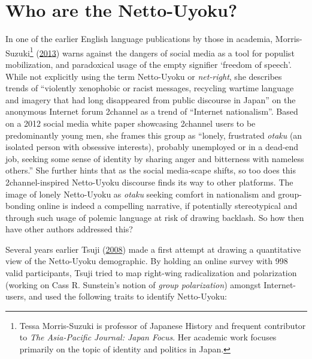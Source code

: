 \documentclass[10pt,british,A4paper,,openany]{memoir}
\begin{document}
\section{Who are the Netto-Uyoku?}\label{who-are-the-netto-uyoku}

In one of the earlier English language publications by those in
academia, Morris-Suzuki\footnote{Tessa Morris-Suzuki is professor of
  Japanese History and frequent contributor to \emph{The Asia-Pacific
  Journal: Japan Focus}. Her academic work focuses primarily on the
  topic of identity and politics in Japan.}
(\protect\hyperlink{ref-morris-suzuki_freedom_2013}{2013}) warns against
the dangers of social media as a tool for populist mobilization, and
paradoxical usage of the empty signifier `freedom of speech'. While not
explicitly using the term Netto-Uyoku or \emph{net-right}, she describes
trends of ``violently xenophobic or racist messages, recycling wartime
language and imagery that had long disappeared from public discourse in
Japan'' on the anonymous Internet forum 2channel as a trend of
``Internet nationalism''. Based on a 2012 social media white paper
showcasing 2channel users to be predominantly young men, she frames this
group as ``lonely, frustrated \emph{otaku} (an isolated person with
obsessive interests), probably unemployed or in a dead-end job, seeking
some sense of identity by sharing anger and bitterness with nameless
others.'' She further hints that as the social media-scape shifts, so
too does this 2channel-inspired Netto-Uyoku discourse finds its way to
other platforms. The image of lonely Netto-Uyoku as \emph{otaku} seeking
comfort in nationalism and group-bonding online is indeed a compelling
narrative, if potentially stereotypical and through such usage of
polemic language at risk of drawing backlash. So how then have other
authors addressed this?

Several years earlier Tsuji
(\protect\hyperlink{ref-tsuji_eng:_2008}{2008}) made a first attempt at
drawing a quantitative view of the Netto-Uyoku demographic. By holding
an online survey with 998 valid participants, Tsuji tried to map
right-wing radicalization and polarization (working on Cass R.
Sunstein's notion of \emph{group polarization}) amongst Internet-users,
and used the following traits to identify Netto-Uyoku:
\end{document}
